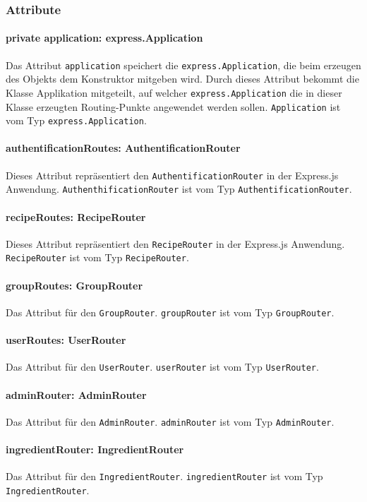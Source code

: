 \documentclass[parskip=full]{scrartcl}
\begin{document}
\subsubsection*{Attribute}
\paragraph{private application: express.Application}Das Attribut \texttt{application} speichert die \newline
\texttt{express.Application}, die beim erzeugen des Objekts dem Konstruktor mitgeben wird.
Durch dieses Attribut bekommt die Klasse Applikation mitgeteilt, auf welcher \texttt{express.Application} die in dieser Klasse erzeugten Routing-Punkte angewendet werden sollen.
\texttt{Application} ist vom Typ \texttt{express.Application}.
\paragraph{authentificationRoutes: AuthentificationRouter}Dieses Attribut repräsentiert den \newline
\texttt{AuthentificationRouter} in der Express.js Anwendung. \texttt{AuthenthificationRouter} ist vom Typ \texttt{AuthentificationRouter}.
\paragraph{recipeRoutes: RecipeRouter}Dieses Attribut repräsentiert den \texttt{RecipeRouter} in der Express.js Anwendung. \texttt{RecipeRouter} ist vom Typ \texttt{RecipeRouter}.
\paragraph{groupRoutes: GroupRouter}Das Attribut für den \texttt{GroupRouter}. \texttt{groupRouter} ist vom \newline
Typ \texttt{GroupRouter}.
\paragraph{userRoutes: UserRouter}Das Attribut für den \texttt{UserRouter}. \texttt{userRouter} ist vom Typ \newline
\texttt{UserRouter}.
\paragraph{adminRouter: AdminRouter}Das Attribut für den \texttt{AdminRouter}. \texttt{adminRouter} ist vom Typ \texttt{AdminRouter}.
\paragraph{ingredientRouter: IngredientRouter}Das Attribut für den \texttt{IngredientRouter}. \newline
 \texttt{ingredientRouter} ist vom Typ \texttt{IngredientRouter}.
\end{document}
